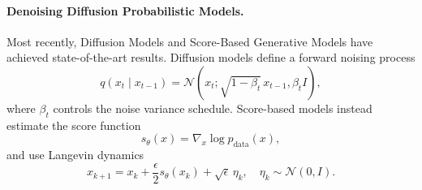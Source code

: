 \paragraph{Denoising Diffusion Probabilistic Models.}
Most recently, Diffusion Models \citep{pmlr-v37-sohl-dickstein15, NEURIPS2020_4c5bcfec} and Score-Based Generative Models \citep{sgm_yang_song_2023} have achieved state-of-the-art results. Diffusion models define a forward noising process
\begin{equation}
q(x_t \mid x_{t-1}) = \mathcal{N}(x_t; \sqrt{1-\beta_t}\, x_{t-1}, \beta_t I),
\end{equation}
where $\beta_t$ controls the noise variance schedule. Score-based models instead estimate the score function
\begin{equation}
s_\theta(x) = \nabla_x \log p_{\text{data}}(x),
\end{equation}
and use Langevin dynamics
\begin{equation}
x_{k+1} = x_k + \frac{\epsilon}{2} s_\theta(x_k) + \sqrt{\epsilon}\, \eta_k, \quad \eta_k \sim \mathcal{N}(0, I).
\end{equation}